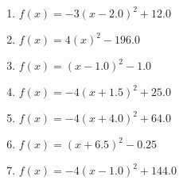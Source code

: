 \documentclass{article}%
\begin{document}
\begin{enumerate}[label=\alph*)]
\item%
\newline\vspace{0.5cm} $f(x)=-3(x-2.0)^2 +12.0$%
\item%
\newline\vspace{0.5cm} $f(x)=4(x)^2 -196.0$%
\item%
\newline\vspace{0.5cm} $f(x)=(x-1.0)^2 -1.0$%
\item%
\newline\vspace{0.5cm} $f(x)=-4(x+1.5)^2 +25.0$%
\item%
\newline\vspace{0.5cm} $f(x)=-4(x+4.0)^2 +64.0$%
\item%
\newline\vspace{0.5cm} $f(x)=(x+6.5)^2 -0.25$%
\item%
\newline\vspace{0.5cm} $f(x)=-4(x-1.0)^2 +144.0$%
\end{enumerate}

%
\end{document}
